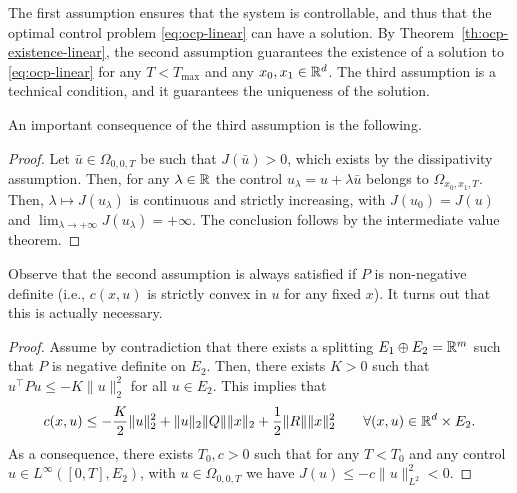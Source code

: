 The first assumption ensures that the system is controllable, and thus that the optimal control problem \eqref{eq:ocp-linear} can have a solution. 
By Theorem~\ref{th:ocp-existence-linear}, the second assumption guarantees the existence of a solution to \eqref{eq:ocp-linear} for any $T<T_{\max}$ and any $x_0,x_1\in \mathbb{R}^d$.
The third assumption is a technical condition, and it guarantees the uniqueness of the solution.

An important consequence of the third assumption is the following.


\begin{proof}
    Let $\bar u \in \Omega_{0,0,T}$ be such that $J(\bar u)>0$, which exists by the dissipativity assumption.
    Then, for any $\lambda\in\mathbb{R}$ the control $u_\lambda = u+\lambda\bar u$ belongs to $\Omega_{x_0,x_1,T}$.
    Then, $\lambda\mapsto J(u_\lambda)$ is continuous and strictly increasing, with $J(u_0)=J(u)$ and $\lim_{\lambda\to +\infty} J(u_\lambda) = +\infty$.
    The conclusion follows by the intermediate value theorem.
\end{proof}

Observe that the second assumption is always satisfied if $P$ is non-negative definite (i.e., $c(x,u)$ is strictly convex in $u$ for any fixed $x$).
It turns out that this is actually necessary.


\begin{proof}
    Assume by contradiction that there exists a splitting $E_1\oplus E_2 = \mathbb{R}^m$ such that $P$ is negative definite on $E_2$.
    Then, there exists $K>0$ such that $u^\top P u \le -K \|u\|_2^2$ for all $u\in E_2$.
    This implies that 
    \begin{equation}
        c(x,u) \le -\frac{K}2 \|u\|_2^2 + \|u\|_2\|Q\|\|x\|_2 + \frac12 \|R\|\|x\|_2^2 \qquad \forall (x,u)\in \mathbb{R}^d\times E_2.
    \end{equation}
    As a consequence, there exists $T_0,c>0$ such that for any $T<T_0$ and any control $u\in L^\infty([0,T],E_2)$, with $u\in \Omega_{0,0,T}$ we have $J(u)\le -c\|u\|_{L^2}^2<0$.
\end{proof}

